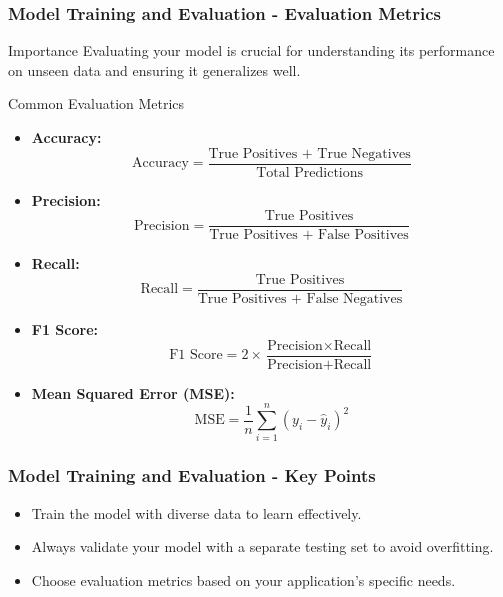 \documentclass[aspectratio=169]{beamer}
\begin{document}
\begin{frame}[fragile]
    \frametitle{Model Training and Evaluation - Evaluation Metrics}
    \begin{block}{Importance}
        Evaluating your model is crucial for understanding its performance on unseen data and ensuring it generalizes well.
    \end{block}

    \begin{block}{Common Evaluation Metrics}
        \begin{itemize}
            \item \textbf{Accuracy:}
            \begin{equation}
            \text{Accuracy} = \frac{\text{True Positives + True Negatives}}{\text{Total Predictions}}
            \end{equation}
            \item \textbf{Precision:}
            \begin{equation}
            \text{Precision} = \frac{\text{True Positives}}{\text{True Positives + False Positives}}
            \end{equation}
            \item \textbf{Recall:}
            \begin{equation}
            \text{Recall} = \frac{\text{True Positives}}{\text{True Positives + False Negatives}}
            \end{equation}
            \item \textbf{F1 Score:}
            \begin{equation}
            \text{F1 Score} = 2 \times \frac{\text{Precision} \times \text{Recall}}{\text{Precision} + \text{Recall}}
            \end{equation}
            \item \textbf{Mean Squared Error (MSE):}
            \begin{equation}
            \text{MSE} = \frac{1}{n} \sum_{i=1}^{n} (y_i - \hat{y}_i)^2
            \end{equation}
        \end{itemize}
    \end{block}
\end{frame}

\begin{frame}[fragile]
    \frametitle{Model Training and Evaluation - Key Points}
    \begin{itemize}
        \item Train the model with diverse data to learn effectively.
        \item Always validate your model with a separate testing set to avoid overfitting.
        \item Choose evaluation metrics based on your application's specific needs.
    \end{itemize}
\end{frame}
\end{document}
